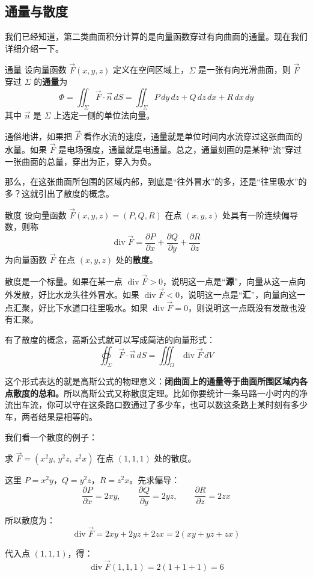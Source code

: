 \subsection{通量与散度}

我们已经知道，第二类曲面积分计算的是向量函数穿过有向曲面的通量。现在我们详细介绍一下。

\begin{definition}{通量}
设向量函数 \(\vec{F}(x,y,z)\) 定义在空间区域上，\(\Sigma\) 是一张有向光滑曲面，则 \(\vec{F}\) 穿过 \(\Sigma\) 的\textbf{通量}为
\[
\Phi = \iint_{\Sigma} \vec{F} \cdot \vec{n}\,dS = \iint_{\Sigma} P\,dy\,dz + Q\,dz\,dx + R\,dx\,dy
\]
其中 \(\vec{n}\) 是 \(\Sigma\) 上选定一侧的单位法向量。
\end{definition}

通俗地讲，如果把 \(\vec{F}\) 看作水流的速度，通量就是单位时间内水流穿过这张曲面的水量。如果 \(\vec{F}\) 是电场强度，通量就是电通量。总之，通量刻画的是某种“流”穿过一张曲面的总量，穿出为正，穿入为负。

那么，在这张曲面所包围的区域内部，到底是“往外冒水”的多，还是“往里吸水”的多？这就引出了散度的概念。

\begin{definition}{散度}
设向量函数 \(\vec{F}(x,y,z) = (P,Q,R)\) 在点 \((x,y,z)\) 处具有一阶连续偏导数，则称
\[
\operatorname{div} \vec{F} = \frac{\partial P}{\partial x} + \frac{\partial Q}{\partial y} + \frac{\partial R}{\partial z}
\]
为向量函数 \(\vec{F}\) 在点 \((x,y,z)\) 处的\textbf{散度}。
\end{definition}

散度是一个标量。如果在某一点 \(\operatorname{div}\vec{F}>0\)，说明这一点是“\textbf{源}”，向量从这一点向外发散，好比水龙头往外冒水。如果 \(\operatorname{div}\vec{F}<0\)，说明这一点是“\textbf{汇}”，向量向这一点汇聚，好比下水道口往里吸水。如果 \(\operatorname{div}\vec{F}=0\)，则说明这一点既没有发散也没有汇聚。

有了散度的概念，高斯公式就可以写成简洁的向量形式：
\[
\oiint_{\Sigma} \vec{F} \cdot \vec{n}\,dS = \iiint_{\Omega} \operatorname{div} \vec{F}\,dV
\]

这个形式表达的就是高斯公式的物理意义：\textbf{闭曲面上的通量等于曲面所围区域内各点散度的总和。}所以高斯公式又称散度定理。比如你要统计一条马路一小时内的净流出车流，你可以守在这条路口数通过了多少车，也可以数这条路上某时刻有多少车，两者结果是相等的。

我们看一个散度的例子：
\begin{myexample}
求 \(\vec{F} = (x^2y,\, y^2z,\, z^2x)\) 在点 \((1,1,1)\) 处的散度。

这里 \(P=x^2y\)，\(Q=y^2z\)，\(R=z^2x\)。先求偏导：
\[
\frac{\partial P}{\partial x}=2xy,\qquad
\frac{\partial Q}{\partial y}=2yz,\qquad
\frac{\partial R}{\partial z}=2zx
\]

所以散度为：
\[
\operatorname{div} \vec{F} = 2xy + 2yz + 2zx = 2(xy+yz+zx)
\]

代入点 \((1,1,1)\)，得：
\[
\operatorname{div} \vec{F}(1,1,1) = 2(1+1+1) = 6
\]
\end{myexample}

